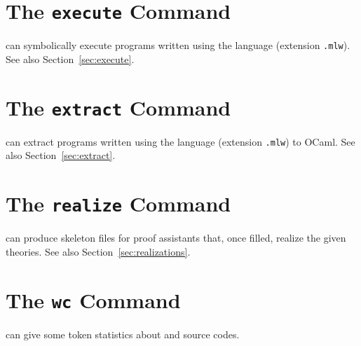 \section{The \texttt{execute} Command}
\label{sec:why3execute}

\why can symbolically execute programs written using the \whyml language
(extension \texttt{.mlw}). See also Section~\ref{sec:execute}.

\section{The \texttt{extract} Command}
\label{sec:why3extract}

\why can extract programs written using the \whyml language
(extension \texttt{.mlw}) to OCaml. See also Section~\ref{sec:extract}.

\section{The \texttt{realize} Command}
\label{sec:why3realize}

\why can produce skeleton files for proof assistants that, once filled,
realize the given theories. See also Section~\ref{sec:realizations}.

\section{The \texttt{wc} Command}
\label{sec:why3wc}

\why can give some token statistics about \why and \whyml source codes.

